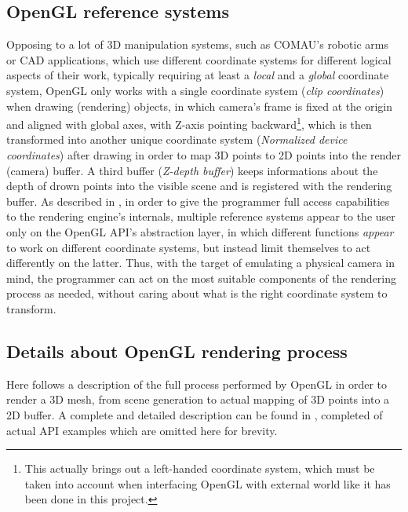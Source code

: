 \subsection{OpenGL reference systems} \label{sec:opengl-reference-systems}
Opposing to a lot of 3D manipulation systems, such as COMAU's robotic arms or
CAD applications, which use different coordinate systems for different logical
aspects of their work, typically requiring at least a \emph{local} and a
\emph{global} coordinate system, OpenGL only works with a single 
coordinate system (\emph{clip coordinates}) when drawing (rendering) objects,
in which camera's frame is fixed at the origin and aligned with global axes,
with Z-axis pointing backward\footnote{This actually brings out a left-handed
  coordinate system, which must be taken into account when interfacing OpenGL
with external world like it has been done in this project.},
which is then transformed into another unique coordinate system
(\emph{Normalized device coordinates}) after drawing in order to map 3D points to 2D points into the
render (camera) buffer. A third buffer (\emph{Z-depth buffer}) keeps
informations about the depth of drown points into the visible scene and is
registered with the rendering buffer. As described in \cite{opengl-book}, in order to give the
programmer full access capabilities to the rendering engine's internals, 
multiple reference systems appear to the user only on the
OpenGL API's abstraction layer, in which different functions \emph{appear} to
work on different coordinate systems, but instead limit themselves to act
differently on the latter. Thus, with the target of emulating a physical
camera in mind, the programmer can act on the most suitable components of the
rendering process as needed, without caring about what is the right coordinate
system to transform. 

\subsection{Details about OpenGL rendering process} \label{sec:opengl-rendering-process}
Here follows a description of the full process performed by OpenGL in order to
render a 3D mesh, from scene generation to actual mapping of 3D points into a
2D buffer. A complete and detailed description can be found in
\cite{opengl-book}, completed of actual API examples which are omitted here
for brevity.

